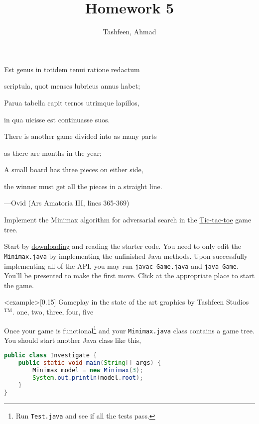 \documentclass{homework}
\author{Tashfeen, Ahmad}
\title{Homework 5}
\begin{document}
 \maketitle

\begin{minipage}[t]{0.45\textwidth}
  \begin{em}
    Est genus in totidem tenui ratione redactum

    scriptula, quot menses lubricus annus habet;

    Parua tabella capit ternos utrimque lapillos,

    in qua uicisse est continuasse suos.
  \end{em}
\end{minipage}
\begin{minipage}[t]{0.5\textwidth}
  There is another game divided into as many parts

  as there are months in the year;

  A small board has three pieces on either side,

  the winner must get all the pieces in a straight line.
\end{minipage}
\begin{flushright}
  ---Ovid (Ars Amatoria III, lines 365-369)
\end{flushright}

\question Implement the Minimax algorithm for adversarial search in the
\href{https://en.wikipedia.org/wiki/Tic-tac-toe}{Tic-tac-toe} game tree.

Start by \href{https://tashfeen.org/raw/share/ds/minimax.zip}{downloading}
and reading the starter code. You need to only edit the
\texttt{Minimax.java} by implementing the unfinished Java
methods. Upon successfully implementing all of the API, you may run
\texttt{javac Game.java} and \texttt{java Game}. You'll be presented
to make the first move.  Click at the appropriate place to start the
game.

\img<example>[0.15]{%
  Gameplay in the state of the art graphics by Tashfeen Studios$^\text{TM}$.
}{one, two, three, four, five}

\question Once your game is functional\footnote{Run \texttt{Test.java}
  and see if all the tests pass.} and your \texttt{Minimax.java} class
contains a game tree.  You should start another Java class like this,
\begin{lstlisting}[language=Java]
public class Investigate {
    public static void main(String[] args) {
        Minimax model = new Minimax(3);
        System.out.println(model.root);
    }
}
\end{lstlisting}
\end{document}
